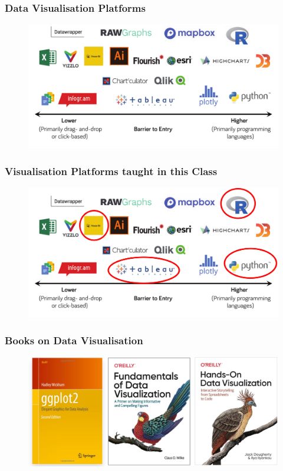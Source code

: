 \documentclass{beamer}
\begin{document}
\begin{frame}[t]\frametitle{Data Visualisation Platforms}\vspace{25pt}
\begin{figure}
\includegraphics[width=0.99\linewidth]{PlotsLec1/DataVizPlatforms}
\end{figure}
\end{frame}

\begin{frame}[t]\frametitle{Visualisation Platforms taught in this Class}\vspace{25pt}
\begin{figure}
\includegraphics[width=0.99\linewidth]{PlotsLec1/DataVizPlatforms3}
\end{figure}
\end{frame}

\begin{frame}[t]\frametitle{Books on Data Visualisation}\vspace{25pt}
\begin{figure}
\includegraphics[width=0.99\linewidth]{PlotsLec1/DataVizBooks}
\end{figure}
\end{frame}
\end{document}
